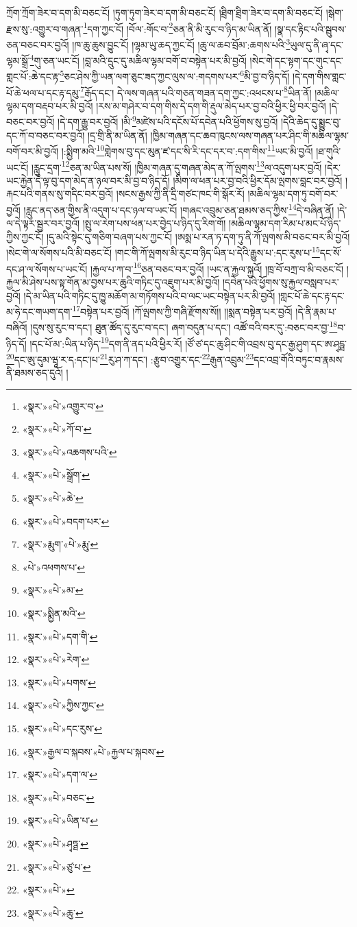 ཀྲོག་ཀྲོག་ཟེར་བ་དག་མི་བཅང་ངོ། །ཏུག་ཏུག་ཟེར་བ་དག་མི་བཅང་ངོ། །ཐྲིག་ཐྲིག་ཟེར་བ་དག་མི་བཅང་ངོ། །སྒེག་རྫས་སུ་:འགྱུར་བ་གཞན་\footnote{«སྣར་»«པེ་»འགྱུར་བ་}དག་ཀྱང་ངོ། །བོལ་:གོང་བ་\footnote{«སྣར་»«པེ་»ཀོ་བ་}ཅན་ནི་མི་རུང་བ་ཉིད་མ་ཡིན་ནོ། །སྣ་དང་རྟིང་པའི་སྦུབས་ཅན་བཅང་བར་བྱའོ། །ཁ་ཆུ་ཆུས་བྱུང་ངོ། །ལྷམ་ཡུ་ཆད་ཀྱང་ངོ། །ཆུ་ལ་ཆབ་བྲོམ་:ཆགས་པའི་\footnote{«སྣར་»«པེ་»འཆགས་པའི་}ཡུལ་དུ་ནི་ཞྭ་དང་ལྷམ་སྒྲོ་\footnote{«སྣར་»«པེ་»སྒྲོག་}གུ་ཅན་ཡང་ངོ། །བླ་མའི་དྲུང་དུ་མཆིལ་ལྷམ་བགོ་བ་བསྟེན་པར་མི་བྱའོ། །སེང་གེ་དང་སྟག་དང་གུང་དང་གླང་པོ་:ཆེ་དང་རྟ་\footnote{«སྣར་»«པེ་»ཆེ་}ཅང་ཤེས་ཀྱི་ཡན་ལག་ཅུང་ཟད་ཀྱང་ལུས་ལ་:གདགས་པར་\footnote{«སྣར་»«པེ་»བདག་པར་}མི་བྱ་བ་ཉིད་དོ། །དེ་དག་གིས་གླང་པོ་ཆེ་ཕལ་པ་དང་རྟ་དམུ་\footnote{«སྣར་»རྨུག་«པེ་»རྨུ་}རྒོད་དང་། དེ་ལས་གཞན་པའི་གཅན་གཟན་དག་ཀྱང་:འཕངས་པ་\footnote{«པེ་»འཕགས་པ་}ཡིན་ནོ། །མཆིལ་ལྷམ་དག་བརྡབ་པར་མི་བྱའོ། །རས་མ་གཤེར་བ་དག་གིས་དེ་དག་གི་རྡུལ་མེད་པར་བྱ་བའི་ཕྱིར་ཕྱི་བར་བྱའོ། །དེ་བཅང་བར་བྱའོ། །དེ་དག་རྒྱུ་བར་བྱའོ། །མི་\footnote{«སྣར་»«པེ་»མ་}མཛེས་པའི་དངོས་པོ་དབེན་པའི་ཕྱོགས་སུ་བྱའོ། །དེའི་ཆེད་དུ་སྨྱུང་བུ་དང་ཀོ་བ་བཅང་བར་བྱའོ། །དྲ་གྲི་ནི་མ་ཡིན་ནོ། །ཁྱིམ་གཞན་དང་ཆབ་ཁུངས་ལས་གཞན་པར་ཤིང་གི་མཆིལ་ལྷམ་བགོ་བར་མི་བྱའོ། །:སྨྱིག་མའི་\footnote{«སྣར་»སྨྱིན་མའི་}གླེགས་བུ་དང་མུན་ཛ་དང་སི་རི་དང་དར་བ་:དག་གིས་\footnote{«སྣར་»«པེ་»དག་གི་}ཡང་མི་བྱའོ། །ཐ་གུའི་ཡང་ངོ། །རླུང་དྲག་\footnote{«སྣར་»«པེ་»རེག་}ཅན་མ་ཡིན་པས་སོ། །ཁྱིམ་གཞན་དུ་གཞན་མེད་ན་ཀོ་ལྤགས་\footnote{«སྣར་»«པེ་»པགས་}ལ་འདུག་པར་བྱའོ། །དེར་ཡང་རྐྱེན་དེ་ལྟ་བུ་དག་མེད་ན་ཉལ་བར་མི་བྱ་བ་ཉིད་དོ། །མིག་ལ་ཕན་པར་བྱ་བའི་ཕྱིར་དོམ་ལྤགས་བླང་བར་བྱའོ། །རྐང་པའི་གནས་སུ་གདིང་བར་བྱའོ། །སངས་རྒྱས་ཀྱི་ནི་དྲི་གཙང་ཁང་གི་སྒོར་རོ། །མཆིལ་ལྷམ་དག་ཏུ་བགོ་བར་བྱའོ། །རླུང་ནད་ཅན་གྱིས་ནི་འདུག་པ་དང་ཉལ་བ་ཡང་ངོ། །གཞང་འབྲུམ་ཅན་ཐམས་ཅད་ཀྱིས་\footnote{«སྣར་»«པེ་»ཀྱིས་ཀྱང་}དེ་བཞིན་ནོ། །དེ་ལ་དེ་ལྟར་སྦྱར་བར་བྱའོ། །སྤུ་ལ་རེག་པས་ཕན་པར་བྱེད་པ་ཉིད་དུ་རིག་གོ། །མཆིལ་ལྷམ་དག་རིམ་པ་མང་པོ་ཉིད་ཀྱིས་ཀྱང་ངོ། །དུ་མའི་སྟེང་དུ་གཅིག་བཞག་པས་ཀྱང་ངོ། །ཨསྨ་པ་རན་ཏ་དག་ཏུ་ནི་ཀོ་ལྤགས་མི་བཅང་བར་མི་བྱའོ། །སེང་གེ་ལ་སོགས་པའི་མི་བཅང་ངོ། །གང་གི་ཀོ་ལྤགས་མི་རུང་བ་ཉིད་ཡིན་པ་དེའི་རྒྱུས་པ་:དང་རུས་པ་\footnote{«སྣར་»«པེ་»དང་རུས་}དང་སོ་དང་ཤ་ལ་སོགས་པ་ཡང་ངོ། །རྐྱལ་པ་ཀ་བ་\footnote{«སྣར་»རྒྱལ་བ་སྐབས་«པེ་»རྐྱལ་པ་སྐབས་}ཅན་བཅང་བར་བྱའོ། །ཡང་ན་རྐྱལ་སྐྱའོ། །ཁྲ་བོ་བཀྲ་བ་མི་བཅང་ངོ། །རྐྱལ་མི་ཤེས་པས་སྟ་གོན་མ་བྱས་པར་ཆུའི་གཏིང་དུ་འཇུག་པར་མི་བྱའོ། །དབེན་པའི་ཕྱོགས་སུ་རྐྱལ་བསླབ་པར་བྱའོ། །དེ་མ་ཡིན་པའི་གཏིང་དུ་ཁྱུ་མཆོག་མ་གཏོགས་པའི་བ་ལང་ཡང་བསྟེན་པར་མི་བྱའོ། །གླང་པོ་ཆེ་དང་རྟ་དང་མ་ཧེ་དང་གཡག་དག་\footnote{«སྣར་»«པེ་»དག་ལ་}བསྟེན་པར་བྱའོ། །ཀོ་ལྤགས་ཀྱི་གཞི་རྫོགས་སོ།། །།སྨན་བསྟེན་པར་བྱའོ། །དེ་ནི་རྣམ་པ་བཞིའོ། །དུས་སུ་རུང་བ་དང་། ཐུན་ཚོད་དུ་རུང་བ་དང་། ཞག་བདུན་པ་དང་། འཚོ་བའི་བར་དུ་:བཅང་བར་བྱ་\footnote{«སྣར་»«པེ་»བཅང་}བ་ཉིད་དོ། །དང་པོ་མ་:ཡིན་པ་ཉིད་\footnote{«སྣར་»«པེ་»ཡིན་པ་}དག་ནི་ནད་པའི་ཕྱིར་རོ། །ཙོ་ཙ་དང་ཆུ་ཤིང་གི་འབྲས་བུ་དང་རྒྱ་ཤུག་དང་ཨ་ཤྭདྠ་\footnote{«སྣར་»«པེ་»ཤྭཏྠ་}དང་ཨུ་དུམ་ཝཱ་ར་ད:དང་།པ་\footnote{«སྣར་»«པེ་»ཙུ་པ་}རུ་ཤ་ཀ་དང་། :རྩུབ་འགྱུར་དང་\footnote{«སྣར་»«པེ་»}རྒུན་འབྲུམ་\footnote{«སྣར་»«པེ་»ཆུ་}དང་འབྲ་གོའི་བཏུང་བ་རྣམས་ནི་ཐམས་ཅད་དུའོ། །
